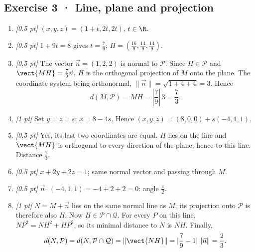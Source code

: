 \subsection*{Exercise 3 · Line, plane and projection}\begin{enumerate}

\item \textit{[0.5 pt]} $(x,y,z)=(1+t,2t,2t)$, $t\in\R$.

\item \textit{[0.5 pt]} $1+9t=8$ gives $t=\frac{7}{9}$; $H=(\frac{16}{9},\frac{14}{9},\frac{14}{9})$.

\item \textit{[0.5 pt]} The vector $\vec n=(1,2,2)$ is normal to $\mathcal P$. Since $H\in\mathcal P$ and $\vect{MH}=\frac{7}{9}\vec n$, $H$ is the orthogonal projection of $M$ onto the plane. The coordinate system being orthonormal, $\|\vec n\|=\sqrt{1+4+4}=3$. Hence
\[d(M,\mathcal P)=MH=|\frac{7}{9}|\,3=\frac{7}{3}.\]

\item \textit{[1 pt]} Set $y=z=s$; $x=8-4s$. Hence $(x,y,z)=(8,0,0)+s(-4,1,1)$.

\item \textit{[0.5 pt]} Yes, its last two coordinates are equal. $H$ lies on the line and $\vect{MH}$ is orthogonal to every direction of the plane, hence to this line. Distance $\frac{7}{3}$.

\item \textit{[0.5 pt]} $x+2y+2z=1$; same normal vector and passing through $M$.

\item \textit{[0.5 pt]} $\vec n\cdot(-4,1,1)=-4+2+2=0$: angle $\frac{\pi}{2}$.

\item \textit{[1 pt]} $N=M+\vec n$ lies on the same normal line as $M$; its projection onto $\mathcal P$ is therefore also $H$. Now $H\in\mathcal P\cap\mathcal Q$. For every $P$ on this line, $NP^2=NH^2+HP^2$, so its minimal distance to $N$ is $NH$. Finally,
\[d(N,\mathcal P)=d(N,\mathcal P\cap\mathcal Q)=\|\vect{NH}\|=|\frac{7}{9}-1|\,\|\vec n\|=\frac{2}{3}.\]

\end{enumerate}

